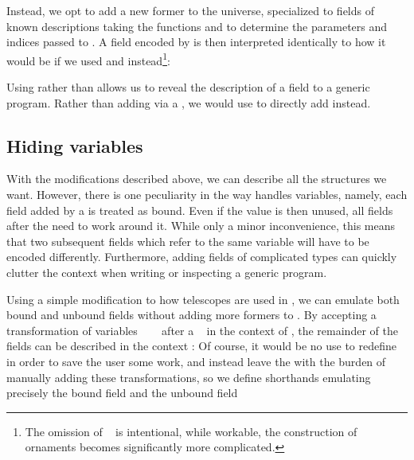 Instead, we opt to add a new former to the universe, specialized to fields of known descriptions
taking the functions  and  to determine the parameters and indices passed to . A field encoded by  is then interpreted identically to how it would be if we used  and  instead\footnote{The omission of \  is intentional, while workable, the construction of ornaments becomes significantly more complicated.}:

Using  rather than  allows us to reveal the description of a field to a generic program. Rather than adding  via a , we would use  to directly add  instead. 

\subsection{Hiding variables}
With the modifications described above, we can describe all the structures we want. However, there is one peculiarity in the way  handles variables, namely, each field added by a  is treated as bound. Even if the value is then unused, all fields after the  need to work around it. While only a minor inconvenience, this means that two subsequent fields which refer to the same variable will have to be encoded differently. Furthermore, adding fields of complicated types can quickly clutter the context when writing or inspecting a generic program.

Using a simple modification to how telescopes are used in , we can emulate both bound and unbound fields without adding more formers to . By accepting a transformation of variables \ \ \  after a \  in the context of , the remainder of the fields can be described in the context :
Of course, it would be no use to redefine  in order to save the user some work, and instead leave the with the burden of manually adding these transformations, so we define shorthands emulating precisely the bound field
and the unbound field



